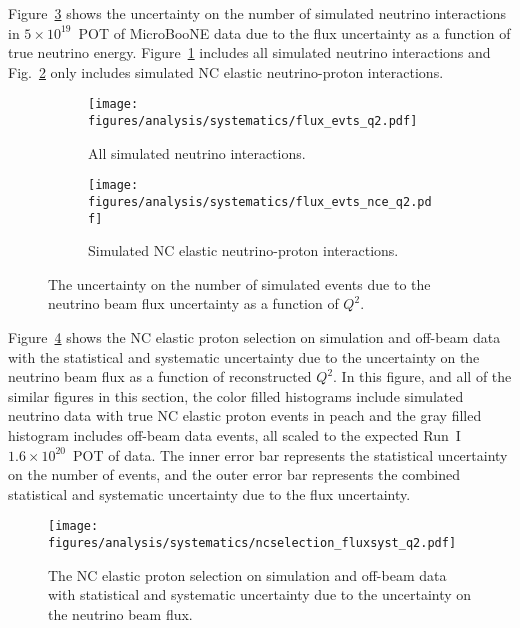     Figure~\ref{fig:fluxq2} shows the uncertainty on the number of simulated
    neutrino interactions in $5\times 10^{19}$~POT of MicroBooNE data due to
    the flux uncertainty as a function of true neutrino energy.
    Figure~\ref{fig:fluxq2all} includes all simulated neutrino interactions and
    Fig.~\ref{fig:fluxq2nce} only includes simulated NC elastic neutrino-proton
    interactions.
    \begin{figure}[h]
      \centering
      \begin{subfigure}[t]{2.8in}
        \texttt{[image: figures/analysis/systematics/flux\_evts\_q2.pdf]}
        \caption{All simulated neutrino interactions.}
        \label{fig:fluxq2all}
      \end{subfigure}
      \hspace{2pt}
      \begin{subfigure}[t]{2.8in}
        \texttt{[image: figures/analysis/systematics/flux\_evts\_nce\_q2.pdf]}
        \caption{Simulated NC elastic neutrino-proton interactions.}
        \label{fig:fluxq2nce}
      \end{subfigure}
      \caption{The uncertainty on the number of simulated events due to the
      neutrino beam flux uncertainty as a function of $Q^2$.}
      \label{fig:fluxq2}
    \end{figure}

    Figure~\ref{fig:systflux} shows the NC elastic proton selection on
    simulation and off-beam data with the statistical and systematic
    uncertainty due to the uncertainty on the neutrino beam flux as a function
    of reconstructed $Q^2$. In this figure, and all of the similar figures in
    this section, the color filled histograms include simulated neutrino data
    with true NC elastic proton events in peach and the gray filled histogram
    includes off-beam data events, all scaled to the expected Run~I $1.6\times
    10^{20}$~POT of data.  The inner error bar represents the statistical
    uncertainty on the number of events, and the outer error bar represents the
    combined statistical and systematic uncertainty due to the flux
    uncertainty.
    \begin{figure}[ht]
      \centering
      \texttt{[image: figures/analysis/systematics/ncselection\_fluxsyst\_q2.pdf]}
      \caption{The NC elastic proton selection on simulation and off-beam data
      with statistical and systematic uncertainty due to the uncertainty on the
      neutrino beam flux.}
      \label{fig:systflux}
    \end{figure}


